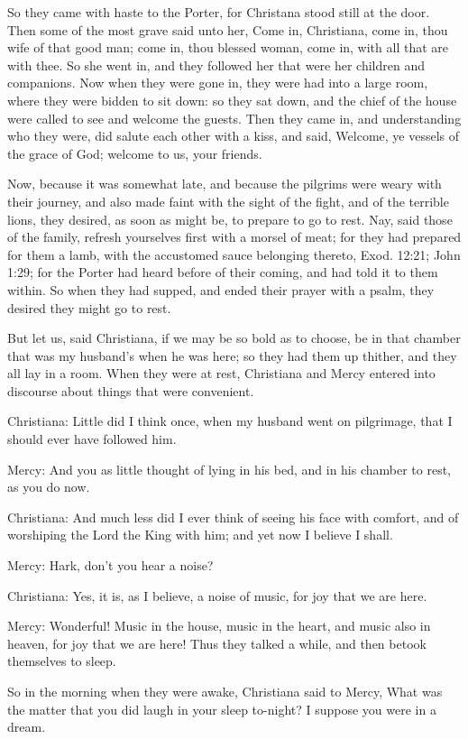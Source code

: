 So they came with haste to the Porter, for Christana stood still at the door. Then some of the most grave said unto her, Come in, Christiana, come in, thou wife of that good man; come in, thou blessed woman, come in, with all that are with thee. So she went in, and they followed her that were her children and companions. Now when they were gone in, they were had into a large room, where they were bidden to sit down: so they sat down, and the chief of the house were called to see and welcome the guests. Then they came in, and understanding who they were, did salute each other with a kiss, and said, Welcome, ye vessels of the grace of God; welcome to us, your friends.

Now, because it was somewhat late, and because the pilgrims were weary with their journey, and also made faint with the sight of the fight, and of the terrible lions, they desired, as soon as might be, to prepare to go to rest. Nay, said those of the family, refresh yourselves first with a morsel of meat; for they had prepared for them a lamb, with the accustomed sauce belonging thereto, Exod. 12:21; John 1:29; for the Porter had heard before of their coming, and had told it to them within. So when they had supped, and ended their prayer with a psalm, they desired they might go to rest.

But let us, said Christiana, if we may be so bold as to choose, be in that chamber that was my husband's when he was here; so they had them up thither, and they all lay in a room. When they were at rest, Christiana and Mercy entered into discourse about things that were convenient.

Christiana: Little did I think once, when my husband went on pilgrimage, that I should ever have followed him.

Mercy: And you as little thought of lying in his bed, and in his chamber to rest, as you do now.

Christiana: And much less did I ever think of seeing his face with comfort, and of worshiping the Lord the King with him; and yet now I believe I shall.

Mercy: Hark, don't you hear a noise?

Christiana: Yes, it is, as I believe, a noise of music, for joy that we are here.

Mercy: Wonderful! Music in the house, music in the heart, and music also in heaven, for joy that we are here! Thus they talked a while, and then betook themselves to sleep.

So in the morning when they were awake, Christiana said to Mercy, What was the matter that you did laugh in your sleep to-night? I suppose you were in a dream.


